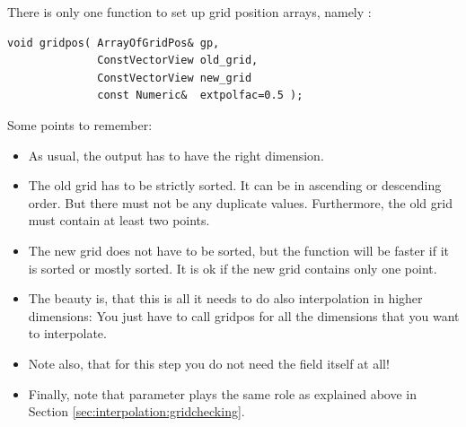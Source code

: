 There is only one function to set up grid position arrays, namely 
:

{\small
\begin{verbatim}
void gridpos( ArrayOfGridPos& gp,
              ConstVectorView old_grid,
              ConstVectorView new_grid 
              const Numeric&  extpolfac=0.5 );
\end{verbatim}
}

\hspace{-\parindent}Some points to remember:
\begin{itemize}
\item As usual, the output  has to have the right dimension. 
  
\item The old grid has to be strictly sorted. It can be in ascending
  or descending order. But there must not be any duplicate values.
  Furthermore, the old grid must contain at least two points.
  
\item   The new grid does not have to be sorted, but the function will be
  faster if it is sorted or mostly sorted. It is ok if the new grid
  contains only one point.
  
\item   The beauty is, that this is all it needs to do also interpolation in
  higher dimensions: You just have to call gridpos for all the
  dimensions that you want to interpolate.
  
\item   Note also, that for this step you do not need the field itself at
  all!

\item   Finally, note that parameter  plays the
  same role as explained above in Section
  \ref{sec:interpolation:gridchecking}. 
\end{itemize}

\section{}

